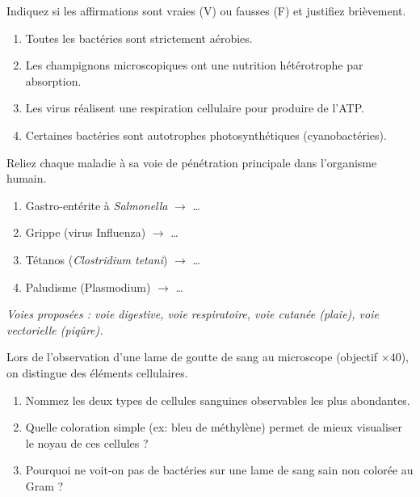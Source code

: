 \documentclass[11pt]{article}
\begin{document}
\begin{exercice}
Indiquez si les affirmations sont vraies (V) ou fausses (F) et justifiez brièvement.
\begin{enumerate}
    \item Toutes les bactéries sont strictement aérobies.
    \item Les champignons microscopiques ont une nutrition hétérotrophe par absorption.
    \item Les virus réalisent une respiration cellulaire pour produire de l'ATP.
    \item Certaines bactéries sont autotrophes photosynthétiques (cyanobactéries).
\end{enumerate}
\end{exercice}

\begin{exercice}
Reliez chaque maladie à sa voie de pénétration principale dans l'organisme humain.
\begin{enumerate}
    \item Gastro-entérite à \textit{Salmonella} \quad $\rightarrow$ \quad \ldots
    \item Grippe (virus Influenza) \quad $\rightarrow$ \quad \ldots
    \item Tétanos (\textit{Clostridium tetani}) \quad $\rightarrow$ \quad \ldots
    \item Paludisme (Plasmodium) \quad $\rightarrow$ \quad \ldots
\end{enumerate}
\textit{Voies proposées : voie digestive, voie respiratoire, voie cutanée (plaie), voie vectorielle (piqûre).}
\end{exercice}

\begin{exercice}
Lors de l'observation d'une lame de goutte de sang au microscope (objectif $\times 40$), on distingue des éléments cellulaires.
\begin{enumerate}
    \item Nommez les deux types de cellules sanguines observables les plus abondantes.
    \item Quelle coloration simple (ex: bleu de méthylène) permet de mieux visualiser le noyau de ces cellules ?
    \item Pourquoi ne voit-on pas de bactéries sur une lame de sang sain non colorée au Gram ?
\end{enumerate}
\end{exercice}
\end{document}

